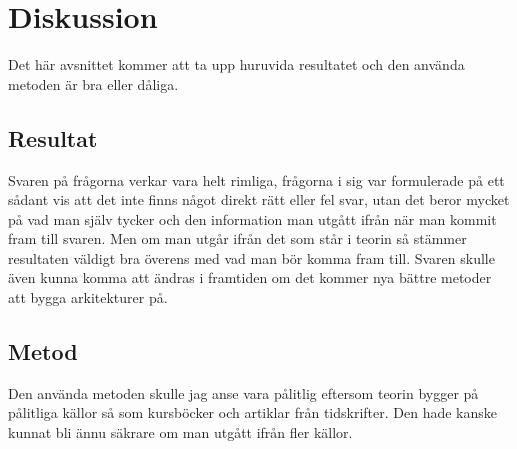 \section{Diskussion}
Det här avsnittet kommer att ta upp huruvida resultatet och den använda metoden är bra eller dåliga.

\subsection{Resultat}
Svaren på frågorna verkar vara helt rimliga, frågorna i sig var formulerade på ett sådant vis att det inte finns något direkt rätt eller fel svar, utan det beror mycket på vad man själv tycker och den information man utgått ifrån när man kommit fram till svaren. Men om man utgår ifrån det som står i teorin så stämmer resultaten väldigt bra överens med vad man bör komma fram till.
\newline
\newline
Svaren skulle även kunna komma att ändras i framtiden om det kommer nya bättre metoder att bygga arkitekturer på.

\subsection{Metod}
Den använda metoden skulle jag anse vara pålitlig eftersom teorin bygger på pålitliga källor så som kursböcker och artiklar från tidskrifter. Den hade kanske kunnat bli ännu säkrare om man utgått ifrån fler källor.

